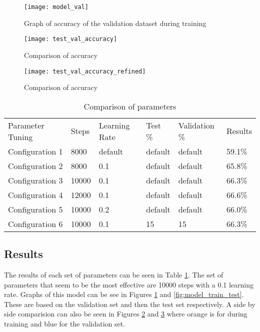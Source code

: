 \begin{figure}
    \texttt{[image: model\_val]}
     \caption{Graph of accuracy of the validation dataset during training}
     \label{fig:model_train_val}
\end{figure}

\begin{figure}
    \texttt{[image: test\_val\_accuracy]}
     \caption{Comparison of accuracy}
     \label{fig:test_val_accuracy}
\end{figure}

\begin{figure}
    \texttt{[image: test\_val\_accuracy\_refined]}
     \caption{Comparison of accuracy}
     \label{fig:test_val_accuracy_refined}
\end{figure}


\begin{table}[]
	\centering
	\caption{Comparison of parameters}
	\label{parameter_tuning_table}
	\begin{tabular}{llllll}
		Parameter Tuning & Steps & Learning Rate & Test \% & Validation \% &
		Results \\
		Configuration 1  & 8000  & default       & default & default       &
		59.1\%  \\
		Configuration 2  & 8000  & 0.1           & default & default       &
		65.8\%  \\
		Configuration 3  & 10000 & 0.1           & default & default       &
		66.3\%  \\
		Configuration 4  & 12000 & 0.1           & default & default       &
		66.6\%  \\
		Configuration 5  & 10000 & 0.2           & default & default       &
		66.0\%  \\
		Configuration 6  & 10000 & 0.1           & 15      & 15            &
		66.3\% 
	\end{tabular}
\end{table}

\subsection*{Results}
The results of each set of parameters can be seen in Table
\ref{parameter_tuning_table}. The set of parameters that seem to be the most
effective are 10000 steps with a 0.1 learning rate. Graphs of this model can be
see in Figures \ref{fig:model_train_val} and \ref{fig:model_train_test}. These
are based on the validation set and then the test set respectively. A side by
side comparision can also be seen in Figures \ref{fig:test_val_accuracy} and
\ref{fig:test_val_accuracy_refined} where orange is for during training and blue
for the validation set.
